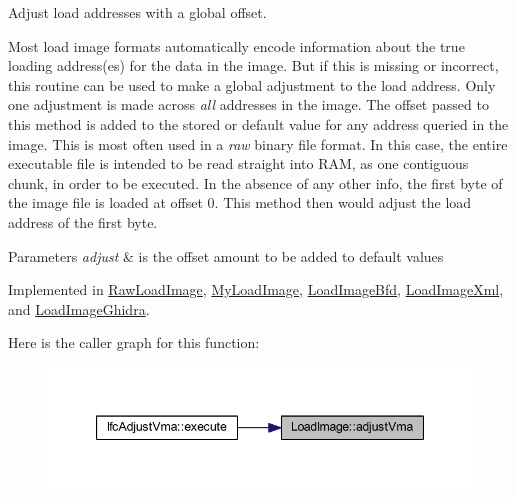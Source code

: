 Adjust load addresses with a global offset. 

Most load image formats automatically encode information about the true loading address(es) for the data in the image. But if this is missing or incorrect, this routine can be used to make a global adjustment to the load address. Only one adjustment is made across {\itshape all} addresses in the image. The offset passed to this method is added to the stored or default value for any address queried in the image. This is most often used in a {\itshape raw} binary file format. In this case, the entire executable file is intended to be read straight into R\+AM, as one contiguous chunk, in order to be executed. In the absence of any other info, the first byte of the image file is loaded at offset 0. This method then would adjust the load address of the first byte. 
\begin{DoxyParams}{Parameters}
{\em adjust} & is the offset amount to be added to default values \\
\hline
\end{DoxyParams}


Implemented in \mbox{\hyperlink{class_raw_load_image_aee25cd14ca80ad47db0b17d56cc31180}{Raw\+Load\+Image}}, \mbox{\hyperlink{class_my_load_image_aa395d2908f2d6d61295ce0d5995838a9}{My\+Load\+Image}}, \mbox{\hyperlink{class_load_image_bfd_a92442c79bbcb55ef602bd9cb092da87e}{Load\+Image\+Bfd}}, \mbox{\hyperlink{class_load_image_xml_ab6a98e9bcf8141caee525fefc6a6d115}{Load\+Image\+Xml}}, and \mbox{\hyperlink{class_load_image_ghidra_a4abe9a4fba1ce99fe3f29ff1236f541e}{Load\+Image\+Ghidra}}.

Here is the caller graph for this function\+:
\nopagebreak
\begin{figure}[H]
\begin{center}
\leavevmode
\includegraphics[width=347pt]{class_load_image_a51a254f705fba6f0e6524995acd5aaa7_icgraph}
\end{center}
\end{figure}
\mbox{\label{class_load_image_a6358439b2aaef7497dad384b7c43213f}} 

